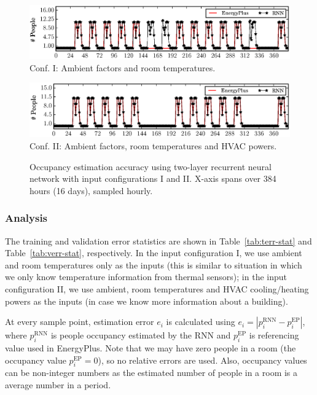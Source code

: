\begin{figure}[h]

\begin{minipage}{\textwidth}
\centering\includegraphics[width=5in]{figs/results/2LRoomTOnlyDPFAugW3-4}
Conf. I: Ambient factors and room temperatures.
\end{minipage}
\hfill

\vspace{3ex}

\noindent\begin{minipage}{\textwidth}
\centering\includegraphics[width=5in]{figs/results/2LAmbHVACDPFAugW3-4}
Conf. II: Ambient factors, room temperatures and HVAC powers.
\end{minipage}
\hfill
\caption{\textcolor{feb18rev}{Occupancy estimation accuracy using two-layer recurrent neural network
    with input configurations I and II. X-axis spans over
    384 hours (16 days), sampled hourly.}}\label{fig:two-layer}
\end{figure}


\subsubsection{Analysis}
The training and validation error statistics are shown in
Table~\ref{tab:terr-stat} and Table~\ref{tab:verr-stat}, respectively.
In the input configuration I, we use ambient and room temperatures
only as the inputs (this is similar to situation in which we only know
temperature information from thermal sensors); in the input
configuration II, we use ambient, room temperatures and HVAC
cooling/heating powers as the inputs (in case we know more information
about a building).

At every sample point, estimation error $e_i$ is calculated using
$e_i=\left|p_i^{\text{RNN}}-p_i^{\text{EP}}\right|$, where
$p_i^{\text{RNN}}$ is people occupancy estimated by the RNN and
$p_i^{\text{EP}}$ is referencing value used in EnergyPlus. Note that we may
have zero people in a room (the occupancy value $p_i^\text{EP} = 0$), so
no relative errors are used. Also, occupancy values can be
non-integer numbers as the estimated number of people in a room is a
average number in a period.


